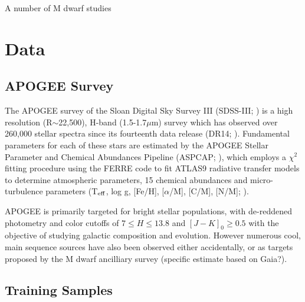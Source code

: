 \documentclass[modern]{aastex62}
\begin{document}
A number of M dwarf studies


\section{Data} \label{sec:data}

\subsection{APOGEE Survey}


The APOGEE survey \citep{Majewski:2015} of the Sloan Digital Sky Survey III (SDSS-III; \citealt{Eisenstein:2011}) is a high resolution (R$\sim$22,500), H-band (1.5-1.7$\mu$m) survey which has observed over 260,000 stellar spectra since its fourteenth data release (DR14; \citealt{Abolfathi:2017}). Fundamental parameters for each of these stars are estimated by the APOGEE Stellar Parameter and Chemical Abundances Pipeline (ASPCAP; \citealt{Perez:2016}), which employs a $\chi^2$ fitting procedure using the FERRE code to fit ATLAS9 radiative transfer models \citep{Castelli:2004} to determine atmospheric parameters, 15 chemical abundances and micro-turbulence parameters (T$_{\rm eff}$, log g, [Fe/H], [$\alpha$/M], [C/M], [N/M]; \citealt{Meszaros:2012}). 

APOGEE is primarily targeted for bright stellar populations, with de-reddened photometry and color cutoffs of $7 \leq H \leq 13.8$ and $[J-K]_0 \geq 0.5$ \citep{Zasowski:2013} with the objective of studying galactic composition and evolution. However numerous cool, main sequence sources have also been observed either accidentally, or as targets proposed by the M dwarf ancilliary survey \citep{Desphande:2013} (specific estimate based on Gaia?).


\subsection{Training Samples}
\end{document}
